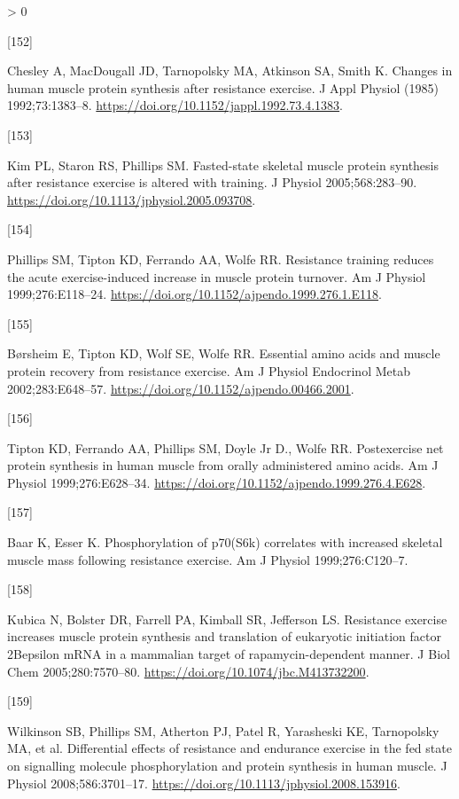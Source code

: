 \documentclass[twoside,10pt]{gihclass} %
\newlength{\cslhangindent}
\newlength{\csllabelwidth}
\newenvironment{CSLReferences}[3] %
 {%
  \setlength{\parindent}{0pt}
  \ifodd #1 \everypar{\setlength{\hangindent}{\cslhangindent}}\ignorespaces\fi
  \ifnum #2 > 0
  \setlength{\parskip}{#2\baselineskip}
  \fi
 }%
 {}
\newcommand{\CSLLeftMargin}[1]{\parbox[t]{\maxof{\widthof{#1}}{\csllabelwidth}}{#1}}
\newcommand{\CSLRightInline}[1]{\parbox[t]{\linewidth}{#1}}
\begin{document}
\begin{CSLReferences}{0}{0}
\leavevmode\hypertarget{ref-RN2717}{}%
\CSLLeftMargin{{[}152{]} }
\CSLRightInline{Chesley A, MacDougall JD, Tarnopolsky MA, Atkinson SA, Smith K. Changes in human muscle protein synthesis after resistance exercise. J Appl Physiol (1985) 1992;73:1383--8. \url{https://doi.org/10.1152/jappl.1992.73.4.1383}.}

\leavevmode\hypertarget{ref-RN1521}{}%
\CSLLeftMargin{{[}153{]} }
\CSLRightInline{Kim PL, Staron RS, Phillips SM. Fasted-state skeletal muscle protein synthesis after resistance exercise is altered with training. J Physiol 2005;568:283--90. \url{https://doi.org/10.1113/jphysiol.2005.093708}.}

\leavevmode\hypertarget{ref-RN2713}{}%
\CSLLeftMargin{{[}154{]} }
\CSLRightInline{Phillips SM, Tipton KD, Ferrando AA, Wolfe RR. Resistance training reduces the acute exercise-induced increase in muscle protein turnover. Am J Physiol 1999;276:E118--24. \url{https://doi.org/10.1152/ajpendo.1999.276.1.E118}.}

\leavevmode\hypertarget{ref-RN2714}{}%
\CSLLeftMargin{{[}155{]} }
\CSLRightInline{Børsheim E, Tipton KD, Wolf SE, Wolfe RR. Essential amino acids and muscle protein recovery from resistance exercise. Am J Physiol Endocrinol Metab 2002;283:E648--57. \url{https://doi.org/10.1152/ajpendo.00466.2001}.}

\leavevmode\hypertarget{ref-RN2715}{}%
\CSLLeftMargin{{[}156{]} }
\CSLRightInline{Tipton KD, Ferrando AA, Phillips SM, Doyle Jr D., Wolfe RR. Postexercise net protein synthesis in human muscle from orally administered amino acids. Am J Physiol 1999;276:E628--34. \url{https://doi.org/10.1152/ajpendo.1999.276.4.E628}.}

\leavevmode\hypertarget{ref-RN866}{}%
\CSLLeftMargin{{[}157{]} }
\CSLRightInline{Baar K, Esser K. Phosphorylation of p70(S6k) correlates with increased skeletal muscle mass following resistance exercise. Am J Physiol 1999;276:C120--7.}

\leavevmode\hypertarget{ref-RN860}{}%
\CSLLeftMargin{{[}158{]} }
\CSLRightInline{Kubica N, Bolster DR, Farrell PA, Kimball SR, Jefferson LS. Resistance exercise increases muscle protein synthesis and translation of eukaryotic initiation factor 2Bepsilon mRNA in a mammalian target of rapamycin-dependent manner. J Biol Chem 2005;280:7570--80. \url{https://doi.org/10.1074/jbc.M413732200}.}

\leavevmode\hypertarget{ref-RN1866}{}%
\CSLLeftMargin{{[}159{]} }
\CSLRightInline{Wilkinson SB, Phillips SM, Atherton PJ, Patel R, Yarasheski KE, Tarnopolsky MA, et al. Differential effects of resistance and endurance exercise in the fed state on signalling molecule phosphorylation and protein synthesis in human muscle. J Physiol 2008;586:3701--17. \url{https://doi.org/10.1113/jphysiol.2008.153916}.}


\end{CSLReferences}
\end{document}
